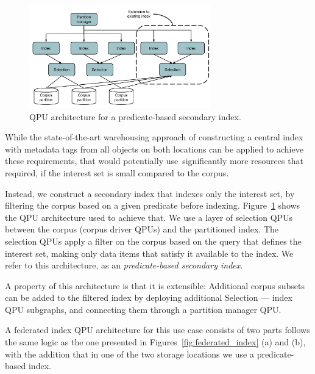 \begin{figure}
  \centering
    \includegraphics[width=0.7\textwidth]{./figures/case_studies/predicate_based_index.pdf}
  \caption{QPU architecture for a predicate-based secondary index.}
  \label{fig:predicate_based_index}
\end{figure}

While the state-of-the-art warehousing approach of constructing a central index with metadata tags from all objects
on both locations can be applied to achieve these requirements,
that would potentially use significantly more resources that required,
if the interest set is small compared to the corpus.

Instead, we construct a secondary index that indexes only the interest set,
by filtering the corpus based on a given predicate before indexing.
Figure~\ref{fig:predicate_based_index} shows the QPU architecture used to achieve that.
We use a layer of selection QPUs between the corpus (corpus driver QPUs) and the partitioned index.
The selection QPUs apply a filter on the corpus based on the query that defines the interest set,
making only data items that satisfy it available to the index.
We refer to this architecture, as an \textit{predicate-based secondary index}.

A property of this architecture is that it is extensible:
Additional corpus subsets can be added to the filtered index by deploying additional Selection --- index QPU subgraphs,
and connecting them through a partition manager QPU.

A federated index QPU architecture for this use case consists of two parts
follows the same logic as the one presented in Figures~\ref{fig:federated_index} (a) and (b),
with the addition that in one of the two storage locations we use a predicate-based index.


